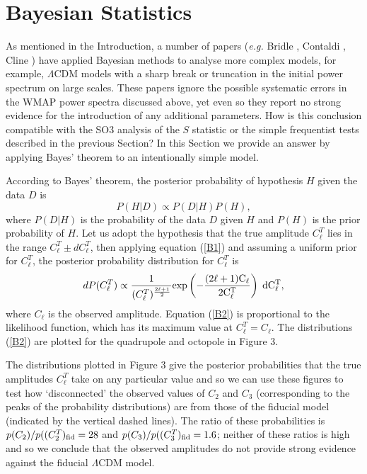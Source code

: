 \section{Bayesian Statistics}



As mentioned in the Introduction, a number of papers ({\it e.g.}
Bridle , Contaldi , Cline ) have
applied Bayesian methods to analyse more complex models, for example,
$\Lambda$CDM models with a sharp break or truncation in the initial power spectrum on
large scales. These papers ignore the possible systematic errors in
the WMAP power spectra discussed above, yet even so they report no
strong evidence for the introduction of any additional parameters. How
is this conclusion compatible with the SO3 analysis of the $S$
statistic or the simple frequentist tests described in the
previous Section? In this Section we provide an answer by applying
Bayes' theorem to an intentionally simple model.


According to Bayes' theorem, the posterior probability 
of hypothesis $H$   given the data $D$ is 
\begin{equation}
   P(H \vert D) \propto P(D \vert H) P(H), \label{B1}
\end{equation}
where $P(D \vert H)$ is the probability of the data $D$ given $H$
and $P(H)$ is the prior probability  of $H$. Let us adopt the 
hypothesis that the true amplitude ${C_\ell^T}$
lies in the range $C_\ell^T \pm dC_\ell^T$, then applying
 equation (\ref{B1}) 
and assuming a uniform prior for $C_\ell^T$, the posterior 
probability distribution for $C_\ell^T$ is
\begin{equation}
   dP(C_\ell^T) \propto  { 1 \over (C_\ell^T)^{2 \ell + 1 \over 2}}
\rm {exp} \left ( - {(2 \ell + 1) C_\ell
\over 2 C^T_\ell } \right )  \; {dC^T_\ell},  \label{B2} 
\end{equation}
where $C_\ell$ is the observed amplitude. Equation (\ref{B2}) is 
proportional to the likelihood function, which has its maximum value
at $C^T_\ell = C_\ell$. The distributions (\ref{B2}) are plotted for
the quadrupole and octopole in Figure 3.

The distributions plotted in Figure 3 give the posterior probabilities
that the true amplitudes $C_\ell^T$ take on any particular value and
so we can use these figures to test how `disconnected' the observed
values of $C_2$ and $C_3$ (corresponding to the
peaks of the probability distributions) are from those of the fiducial model
(indicated by the vertical dashed lines). The ratio of these
probabilities is $p(C_2)/p((C_2^T)_{\rm fid} = 28$ and
$p(C_3)/p((C_3^T)_{\rm fid} = 1.6$; neither of these ratios is high
and so we conclude that the observed amplitudes do not provide
strong evidence against the fiducial $\Lambda$CDM model.  

